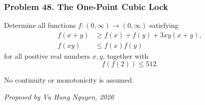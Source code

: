 \subsubsection*{Problem 48. The One-Point Cubic Lock}

\begin{exercisebox}[hard]

Determine all functions $f:(0,\infty)\to(0,\infty)$ satisfying
\[
\boxed{
\begin{aligned}
f(x+y)&\ge f(x)+f(y)+3xy(x+y),\\
f(xy)&\le f(x)f(y)
\end{aligned}}
\]
for all positive real numbers $x,y$, together with
\[
\boxed{\qquad f(f(2))\le512.\qquad}
\]

No continuity or monotonicity is assumed.

\begin{flushright}
\textit{Proposed by Vu Hung Nguyen, 2026}
\end{flushright}


\end{exercisebox}
